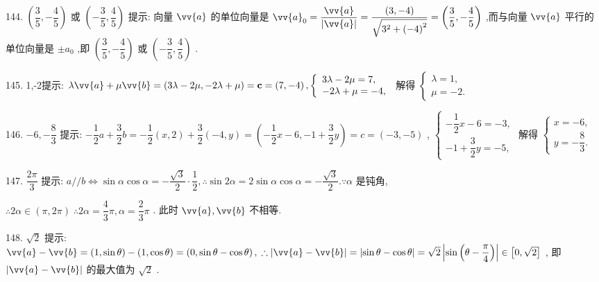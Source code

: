 144. $\left( {\dfrac{3}{5}, - \dfrac{4}{5}}\right)$ 或 $\left( {-\dfrac{3}{5},\dfrac{4}{5}}\right)$ 提示: 向量 $\vv{a}$ 的单位向量是 ${\vv{a}}_{0} = \dfrac{\vv{a}}{\left| \vv{a}\right| } = \dfrac{\left( 3, - 4\right) }{\sqrt{{3}^{2} + {\left( -4\right) }^{2}}} = \left( {\dfrac{3}{5}, - \dfrac{4}{5}}\right)$ ,而与向量 $\vv{a}$ 平行的单位向量是 $\pm  {a}_{0}$ ,即 $\left( {\dfrac{3}{5}, - \dfrac{4}{5}}\right)$ 或 $\left( {-\dfrac{3}{5},\dfrac{4}{5}}\right)$ .

145. 1,-2提示: $\lambda \vv{a} + \mu \vv{b} = \left( {{3\lambda } - {2\mu }, - {2\lambda } + \mu }\right)  = \mathbf{c} = \left( {7, - 4}\right) ,\left\{  \begin{array}{l} {3\lambda } - {2\mu } = 7, \\   - {2\lambda } + \mu  =  - 4, \end{array}\right.$ 解得 $\left\{  \begin{array}{l} \lambda  = 1, \\  \mu  =  - 2. \end{array}\right.$

146. $- 6, - \dfrac{8}{3}$ 提示: $- \dfrac{1}{2}a + \dfrac{3}{2}b =  - \dfrac{1}{2}\left( {x,2}\right)  + \dfrac{3}{2}\left( {-4,y}\right)  = \left( {-\dfrac{1}{2}x - 6, - 1 + \dfrac{3}{2}y}\right)  = c = \left( {-3, - 5}\right)$ , $\left\{  {\begin{array}{l}  - \dfrac{1}{2}x - 6 =  - 3, \\   - 1 + \dfrac{3}{2}y =  - 5, \end{array}\text{ 解得 }\left\{  \begin{array}{l} x =  - 6, \\  y =  - \dfrac{8}{3}. \end{array}\right. }\right.$

147. $\dfrac{2\pi }{3}$ 提示: $a//b \Leftrightarrow  \sin \alpha \cos \alpha  =  - \dfrac{\sqrt{3}}{2} \cdot  \dfrac{1}{2},\therefore \sin {2\alpha } = 2\sin \alpha \cos \alpha  =  - \dfrac{\sqrt{3}}{2}.\because \alpha$ 是钝角,

$\therefore {2\alpha } \in  \left( {\pi ,{2\pi }}\right) \;\therefore {2\alpha } = \dfrac{4}{3}\pi ,\alpha  = \dfrac{2}{3}\pi$ . 此时 $\vv{a},\vv{b}$ 不相等.

148. $\sqrt{2}$ 提示: $\vv{a} - \vv{b} = \left( {1,\sin \theta }\right)  - \left( {1,\cos \theta }\right)  = \left( {0,\sin \theta  - \cos \theta }\right) ,\;\therefore \left| {\vv{a} - \vv{b}}\right|  = \left| {\sin \theta  - \cos \theta }\right|  = \sqrt{2}\left| {\sin \left( {\theta  - \dfrac{\pi }{4}}\right) }\right|  \in  \left\lbrack  {0,\sqrt{2}}\right\rbrack$ , 即 $\left| {\vv{a} - \vv{b}}\right|$ 的最大值为 $\sqrt{2}$ .

